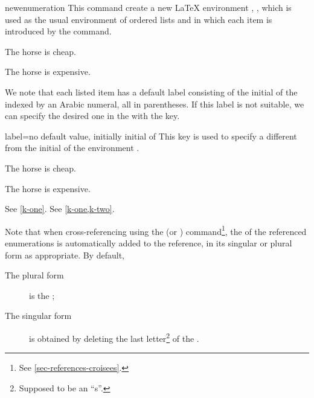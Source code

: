 \documentclass[english,nolocaltoc]{nwejmart}
\newtheorem[style=definition]{fact}
\newtheorem[title-plural=Criteria]{criterion}
\newtheorem[title=random experiment]{rexp}
\begin{document}
\begin{docCommand}[doc new=2019-03-18]{newenumeration}{}
  This command create a new \LaTeX{}  environment , , which
  is used as the usual  environment of
  ordered lists and in which each item is introduced by the
   command.

\begin{preamblecode}
\end{preamblecode}
\begin{bodycode}
\begin{conventions}
\item The horse is cheap.
\item The horse is expensive.
\end{conventions}
\end{bodycode}

We note that each listed item has a default label consisting of the
initial of the  indexed by an Arabic numeral, all in
parentheses. If this label is not suitable, we can specify the desired
one in  the  with the   key.
  \begin{docKey}{label}{={}}{no  default value, initially initial of }
    This key is used to specify a  different from the
    initial of the environment .
  \end{docKey}
\begin{preamblecode}
\end{preamblecode}
\begin{bodycode}[listing and text,listing options={deletekeywords={[2]label}}]
\begin{conventions}
\item\label{k-one} The horse is cheap. 
\item\label{k-two} The horse is expensive. 
\end{conventions}
See \vref{k-one}. See \vref{k-one,k-two}.
\end{bodycode}

Note that when cross-referencing using the  (or
) command\footnote{See \vref{sec-references-croisees}.},
the  of the referenced enumerations is automatically added
to the reference, in its singular or plural form as appropriate. By default,
\begin{description}
\item[The plural form] is the   ;
\item[The singular form] is obtained by deleting the last
  letter\footnote{Supposed to be an \enquote{s}.} of the  .
\end{description}


\end{docCommand}
\end{document}
